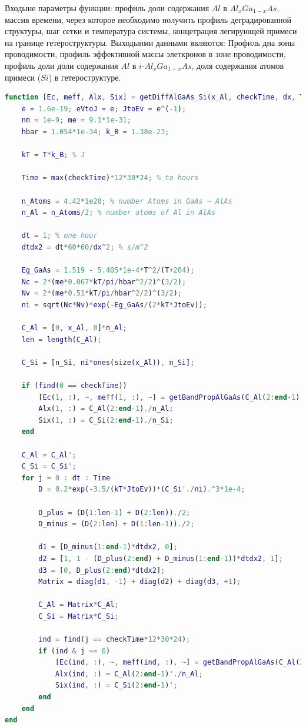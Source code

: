 Входыне параметры функции: профиль доли содержания $Al$ в $Al_{x}Ga_{1-x}As$, массив времени, через которое необходимо получить профиль деградированной структуры, шаг сетки и температура системы, концетрация легирующей примеси на границе гетероструктуры. Выходынми данными являются: Профиль дна зоны проводимости, профиль эффективной массы элеткронов в зоне проводимости, профиль доли доли содержания $Al$ в $i$-$Al_{x}Ga_{1-x}As$, доля содержания атомов примеси ($Si$) в гетероструктуре.
\begin{lstlisting}[style=realcode,language=Matlab,caption={Функция расчета диффузионного расплытия атомов $Al$ в <<открытой>> системе $i$-$Al_{x}Ga_{1-x}As$ с учетом коэффициента диффузии, зависящего от концентрации легирующей примеси},label={lst:DFromC}]
function [Ec, meff, Alx, Six] = getDiffAlGaAs_Si(x_Al, checkTime, dx, T, n_Si)
	e = 1.6e-19; eVtoJ = e; JtoEv = e^(-1);
	nm = 1e-9; me = 9.1*1e-31;
	hbar = 1.054*1e-34; k_B = 1.38e-23;

	kT = T*k_B; % J

	Time = max(checkTime)*12*30*24; % to hours

	n_Atoms = 4.42*1e28; % number Atoms in GaAs ~ AlAs
	n_Al = n_Atoms/2; % number atoms of Al in AlAs

	dt = 1; % one hour
	dtdx2 = dt*60*60/dx^2; % s/m^2

	Eg_GaAs = 1.519 - 5.405*1e-4*T^2/(T+204);
	Nc = 2*(me*0.067*kT/pi/hbar^2/2)^(3/2);
	Nv = 2*(me*0.51*kT/pi/hbar^2/2)^(3/2);
	ni = sqrt(Nc*Nv)*exp(-Eg_GaAs/(2*kT*JtoEv));

	C_Al = [0, x_Al, 0]*n_Al;
	len = length(C_Al);

	C_Si = [n_Si, ni*ones(size(x_Al)), n_Si];

	if (find(0 == checkTime))
		[Ec(1, :), ~, meff(1, :), ~] = getBandPropAlGaAs(C_Al(2:end-1));
		Alx(1, :) = C_Al(2:end-1)./n_Al;		
		Six(1, :) = C_Si(2:end-1)./n_Si;		
	end

	C_Al = C_Al';
	C_Si = C_Si';
	for j = 0 : dt : Time
		D = 0.2*exp(-3.5/(kT*JtoEv))*(C_Si'./ni).^3*1e-4;

		D_plus = (D(1:len-1) + D(2:len))./2;
		D_minus = (D(2:len) + D(1:len-1))./2;

		d1 = [D_minus(1:end-1)*dtdx2, 0];
		d2 = [1, 1 - (D_plus(2:end) + D_minus(1:end-1))*dtdx2, 1];
		d3 = [0, D_plus(2:end)*dtdx2];
		Matrix = diag(d1, -1) + diag(d2) + diag(d3, +1);

		C_Al = Matrix*C_Al;
		C_Si = Matrix*C_Si;

		ind = find(j == checkTime*12*30*24); 
		if (ind & j ~= 0)
			[Ec(ind, :), ~, meff(ind, :), ~] = getBandPropAlGaAs(C_Al(2:end-1)');
			Alx(ind, :) = C_Al(2:end-1)'./n_Al;
			Six(ind, :) = C_Si(2:end-1)';
		end
	end
end
\end{lstlisting}
